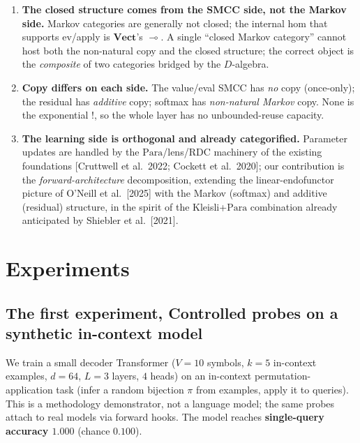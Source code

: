 \documentclass[a4paper,11pt]{article}
\begin{document}
\begin{enumerate}
\def\labelenumi{\arabic{enumi}.}
\item
  \textbf{The closed structure comes from the SMCC side, not the Markov
  side.} Markov categories are generally not closed; the internal hom
  that supports \(\mathrm{ev}\)/apply is \(\mathbf{Vect}\)'s
  \(\multimap\). A single ``closed Markov category'' cannot host both
  the non-natural copy and the closed structure; the correct object is
  the \emph{composite} of two categories bridged by the \(D\)-algebra.
\item
  \textbf{Copy differs on each side.} The value/eval SMCC has \emph{no}
  copy (once-only); the residual has \emph{additive} copy; softmax has
  \emph{non-natural Markov} copy. None is the exponential \(!\), so the
  whole layer has no unbounded-reuse capacity.
\item
  \textbf{The learning side is orthogonal and already categorified.}
  Parameter updates are handled by the \(\mathrm{Para}\)/lens/RDC
  machinery of the existing foundations {[}Cruttwell et al.~2022;
  Cockett et al.~2020{]}; our contribution is the \emph{forward-architecture} decomposition, extending the linear-endofunctor picture of O'Neill et al.~{[}2025{]} with the Markov (softmax) and additive (residual) structure, in the spirit of
  the Kleisli+\(\mathrm{Para}\) combination already anticipated by   Shiebler et al.~{[}2021{]}.
\end{enumerate}

\hypertarget{experiments}{%
\section{Experiments}\label{experiments}}

\hypertarget{the-first-experiment-controlled-probes-on-a-synthetic-in-context-model}{%
\subsection{The first experiment, Controlled probes on a synthetic in-context model}\label{the-first-experiment-controlled-probes-on-a-synthetic-in-context-model}}

We train a small decoder Transformer (\(V=10\) symbols, \(k=5\) in-context examples, \(d=64\), \(L=3\) layers, \(4\) heads) on an
in-context permutation-application task (infer a random bijection \(\pi\) from examples, apply it to queries). This is a methodology
demonstrator, not a language model; the same probes attach to real models via forward hooks. The model reaches \textbf{single-query accuracy \(1.000\)} (chance \(0.100\)).
\end{document}
